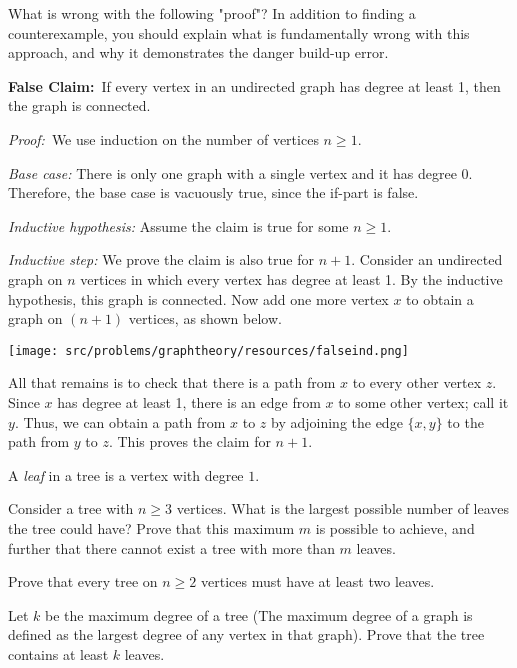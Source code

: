 
What is wrong with the following "proof"? In addition to finding a counterexample, you should explain what is fundamentally wrong with this approach, and why it demonstrates the danger build-up error.

{\bf False Claim:}~If every vertex in an undirected graph has degree at least 1, then the graph is connected.

{\em Proof:}~We use induction on the number of vertices $n \ge 1$.

{\em Base case:} There is only one graph with a single vertex and it has degree 0. Therefore, the base case is vacuously true, since the if-part is false.

{\em Inductive hypothesis:} Assume the claim is true for some $n \ge 1$.

{\em Inductive step:} We prove the claim is also true for $n+1$. Consider an undirected graph on $n$ vertices in which every vertex has degree at least 1. By the inductive hypothesis, this graph is connected. Now add one more vertex $x$ to obtain a graph on $(n + 1)$ vertices, as shown below.
\vspace{-8pt}
  \begin{center}
    \texttt{[image: src/problems/graphtheory/resources/falseind.png]}
  \end{center}
\vspace{-8pt}
All that remains is to check that there is a path from $x$ to every other vertex $z$. Since $x$
has degree at least 1, there is an edge from $x$ to some other vertex; call it $y$. Thus, we
can obtain a path from $x$ to $z$ by adjoining the edge $\{x,y\}$ to the path from $y$ to $z$. This
proves the claim for $n+1$. 



A {\em leaf} in a tree is a vertex with degree $1$.

\begin{Parts}
  \Part 
  Consider a tree with $n \ge 3$ vertices. What is the largest possible number of leaves the tree could have? Prove that this maximum $m$ is possible to achieve, and further that there cannot exist a tree with more than $m$ leaves.

  \Part 
  Prove that every tree on $n \ge 2$ vertices must have at least two leaves.

  \Part
  Let $k$ be the maximum degree of a tree (The maximum degree of a graph is defined as the largest degree of any vertex in that graph). Prove that the tree contains at least $k$ leaves. 

\end{Parts}


